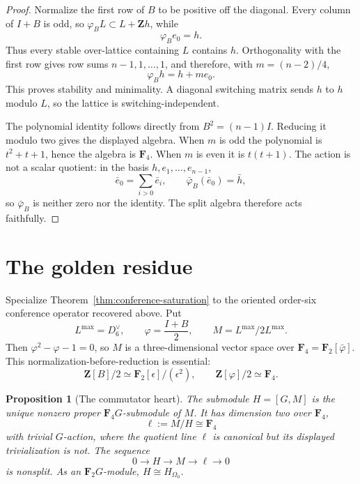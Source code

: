 \documentclass[11pt]{article}
\newtheorem{proposition}[theorem]{Proposition}
\theoremstyle{definition}
\theoremstyle{remark}
\newcommand{\F}{\mathbf F}
\newcommand{\Z}{\mathbf Z}
\begin{document}
\begin{proof}
Normalize the first row of \(B\) to be positive off the diagonal.  Every
column of \(I+B\) is odd, so \(\varphi_B L\subset L+\Z h\), while
\[
                         \varphi_Be_0=h.
\]
Thus every stable over-lattice containing \(L\) contains \(h\).  Orthogonality
with the first row gives row sums \(n-1,1,\ldots,1\), and therefore, with
\(m=(n-2)/4\),
\[
                         \varphi_Bh=h+me_0.
\]
This proves stability and minimality.  A diagonal switching matrix sends
\(h\) to \(h\) modulo \(L\), so the lattice is switching-independent.

The polynomial identity follows directly from \(B^2=(n-1)I\).  Reducing it
modulo two gives the displayed algebra.  When \(m\) is odd the polynomial is
\(t^2+t+1\), hence the algebra is \(\F_4\).  When \(m\) is even it is
\(t(t+1)\).  The action is not a scalar quotient: in the basis
\(h,e_1,\ldots,e_{n-1}\),
\[
 \bar e_0=\sum_{i>0}\bar e_i,\qquad
 \bar\varphi_B(\bar e_0)=\bar h,
\]
so \(\bar\varphi_B\) is neither zero nor the identity.  The split algebra
therefore acts faithfully.
\end{proof}

\section{The golden residue}
\label{sec:golden-residue}

Specialize Theorem~\ref{thm:conference-saturation} to the oriented
order-six conference operator recovered above.  Put
\[
 L^{\max}=D_6^\vee,\qquad \varphi=\frac{I+B}{2},\qquad
 M=L^{\max}/2L^{\max}.
\]
Then \(\varphi^2-\varphi-1=0\), so \(M\) is a three-dimensional vector space
over \(\F_4=\F_2[\bar\varphi]\).  This normalization-before-reduction is
essential:
\[
 \Z[B]/2\simeq\F_2[\epsilon]/(\epsilon^2),\qquad
 \Z[\varphi]/2\simeq\F_4.
\]

\begin{proposition}[The commutator heart]
\label{prop:commutator-heart}
The submodule \(H=[G,M]\) is the unique nonzero proper
\(\F_4G\)-submodule of \(M\).  It has dimension two over \(\F_4\),
\[
                    \ell:=M/H\cong\F_4
\]
with trivial \(G\)-action, where the quotient line \(\ell\) is canonical but
its displayed trivialization is not.  The sequence
\[
 0\longrightarrow H\longrightarrow M\longrightarrow\ell\longrightarrow0
\]
is nonsplit.  As an \(\F_2G\)-module, \(H\cong H_{\Omega_0}\).
\end{proposition}
\end{document}
